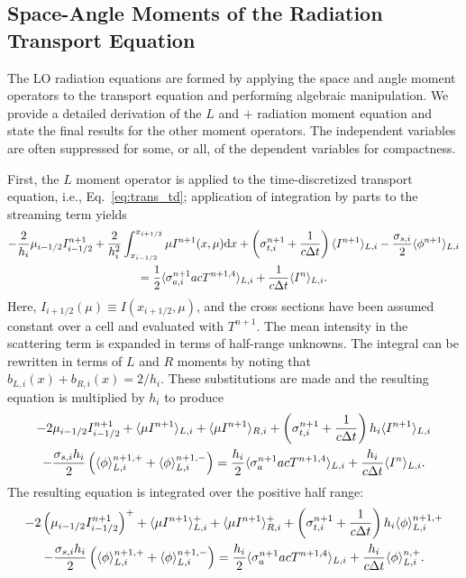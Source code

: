 \subsection{Space-Angle Moments of the Radiation Transport Equation}

The LO radiation equations are formed by applying the space and angle moment operators to the
transport equation and performing algebraic manipulation.  We provide a detailed
derivation of the $L$ and $+$ radiation moment equation and state the final results for the
other moment operators.  The independent variables are often suppressed for some, or
all, of the dependent variables for compactness. 

First, the $L$ moment operator is applied to the time-discretized transport equation,
i.e., Eq.~\eqref{eq:trans_td}; application of integration by parts to the streaming term
yields
\begin{multline}
    -\frac{2}{h_i}{\mu}_{i-1/2} I_{i-1/2}^{n+1} + \frac{2}{h_i^2}\int_{{x_{i-1/2}}}^{{x_{i+1/2}}} \mu I^{n+1}(x,\mu) \mathrm{d} x
        +  \left(\sigma_{t,i}^{n+1}+\frac{1}{c \Delta t} \right)  
        \langle I^{n+1} \rangle_{L,i} -  \frac{\sigma_{s,i} }{2} \langle \phi^{n+1} \rangle_{L,i} \\=
        \frac{1}{2} \langle \sigma_{a,i}^{n+1} a c T^{n+1,4} \rangle_{L,i} +
  \frac{1}{c\Delta t}\langle I^n \rangle_{L,i}.
\end{multline}
Here, $I_{i+1/2}(\mu)\equiv I(x_{i+1/2},\mu)$, and the cross sections have been assumed constant over a cell and evaluated with $T^{n+1}$.  The mean
intensity in the scattering term is expanded in terms of half-range unknowns.
The integral can be rewritten in terms of $L$ and $R$ moments by noting that $b_{L,i}(x) +
b_{R,i}(x) = 2/h_i$.  These substitutions are made and the resulting equation is
multiplied by $h_i$ to produce
\begin{multline}
    -2{\mu}_{i-1/2} I_{i-1/2}^{n+1} + \langle \mu I^{n+1} \rangle_{L,i} + \langle \mu I^{n+1} \rangle_{R,i} 
        +  \left(\sigma_{t,i}^{n+1}+\frac{1}{c \Delta t} \right) h_i 
        \langle I^{n+1} \rangle_{L,i} \\-  \frac{\sigma_{s,i} h_i}{2} \left( \langle \phi \rangle_{L,i}^{n+1,+} +
  \langle \phi \rangle_{L,i}^{n+1,-}\right) = \frac{h_i}{2} \langle \sigma_a^{n+1} a c T^{n+1,4} \rangle_{L,i} +
  \frac{h_i}{c\Delta t}\langle I^n \rangle_{L,i}.
\end{multline}
The resulting equation is integrated over the positive half range:
\begin{multline}\label{eq:spat_mom}
    -2\left({\mu}_{i-1/2} I_{i-1/2}^{n+1}\right)^+ + \langle \mu I^{n+1} \rangle^+_{L,i} + \langle \mu
        I^{n+1} \rangle^+_{R,i} 
        +  \left(\sigma_{t,i}^{n+1}+\frac{1}{c \Delta t} \right) h_i 
  \langle \phi \rangle_{L,i}^{n+1,+} \\-  \frac{\sigma_{s,i} h_i}{2} \left( \langle \phi \rangle_{L,i}^{n+1,+} +
  \langle \phi \rangle_{L,i}^{n+1,-}\right) = \frac{h_i}{2} \langle \sigma_a^{n+1} a c T^{n+1,4} \rangle_{L,i} +
  \frac{h_i}{c\Delta t}\langle \phi \rangle_{L,i}^{n,+}.
\end{multline}

